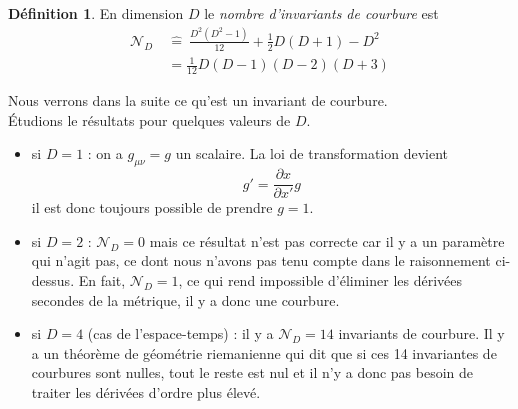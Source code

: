 \documentclass[a4paper,11pt]{report}
\theoremstyle{definition}
\theoremstyle{plain}
\theoremstyle{definition}
\newtheorem{defn}{Définition}[chapter]
\theoremstyle{remark}
\newcommand{\p}{\partial}
\begin{document}
            \begin{defn}
                En dimension $D$ le \textit{nombre d'invariants de courbure} est 
                \begin{align}
                    \mathscr{N}_D ~&\hat{=}~  \frac{D^2(D^2-1)}{12}+\frac{1}{2}D(D+1)-D^2\\
                &= \frac{1}{12}D(D-1)(D-2)(D+3)
                \end{align}
            \end{defn}
            Nous verrons dans la suite ce qu'est un invariant de courbure.\\
            Étudions le résultats pour quelques valeurs de $D$.
            \begin{itemize}[label = \textbullet]
                \item si $D=1$ : on a $g_{\mu\nu} = g$ un scalaire. La loi de transformation devient
                \begin{equation}
                    g' = \frac{\p x}{\p x'} g
                \end{equation}
                il est donc toujours possible de prendre $g=1$.
                \item si $D = 2$ : $\mathscr{N}_D = 0$ mais ce résultat n'est pas correcte car il y a un paramètre qui n'agit pas, ce dont nous n'avons pas tenu compte dans le raisonnement ci-dessus. En fait, $\mathscr{N}_D = 1$, ce qui rend impossible d'éliminer les dérivées secondes de la métrique, il y a donc une courbure.
                \item si $D=4$ (cas de l'espace-temps) : il y a $\mathscr{N}_D = 14$ invariants de courbure. Il y a un théorème de géométrie riemanienne qui dit que si ces 14 invariantes de courbures sont nulles, tout le reste est nul et il n'y a donc pas besoin de traiter les dérivées d'ordre plus élevé.
            \end{itemize}
            
\end{document}
